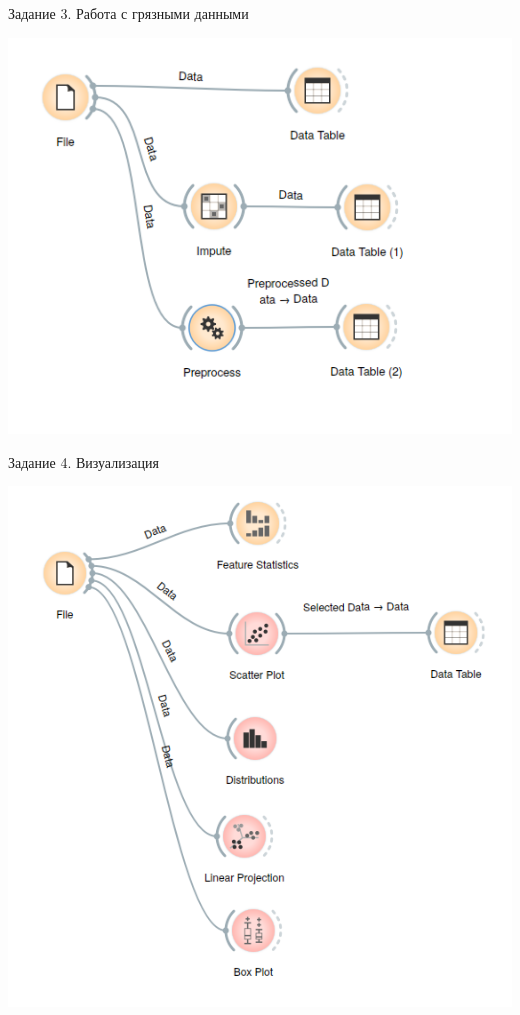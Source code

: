 \documentclass{beamer}
\begin{document}
\begin{frame}{Задание 3. Работа с грязными данными}

  
\includegraphics[scale=0.4]{task03_01.png}


\end{frame}


\begin{frame}{Задание 4. Визуализация}


\includegraphics[scale=0.4]{task04_01.png}

\end{frame}
\end{document}
